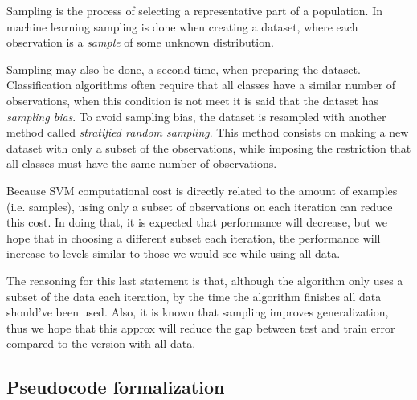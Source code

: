 Sampling is the process of selecting a representative part of a population. In machine learning sampling is done when creating a dataset, where each observation is a \emph{sample} of some unknown distribution. 

Sampling may also be done, a second time, when preparing the dataset. Clas\-si\-fi\-cation algorithms often require that all classes have a similar number of ob\-ser\-va\-tions, when this condition is not meet it is said that the dataset has \emph{sampling bias}. To avoid sampling bias, the dataset is resampled with another method called \emph{stratified random sampling}. This method consists on making a new dataset with only a subset of the observations, while imposing the restriction that all classes must have the same number of observations.

Because SVM computational cost is directly related to the amount of examples (i.e. samples), using only a subset of observations on each iteration can reduce this cost. In doing that, it is expected that performance will decrease, but we hope that in choosing a different subset each iteration, the performance will increase to levels similar to those we would see while using all data.

The reasoning for this last statement is that, although the algorithm only uses a subset of the data each iteration, by the time the algorithm finishes all data should've been used. Also, it is known that sampling improves generalization, thus we hope that this approx will reduce the gap between test and train error compared to the version with all data.

\subsection{Pseudocode formalization}


